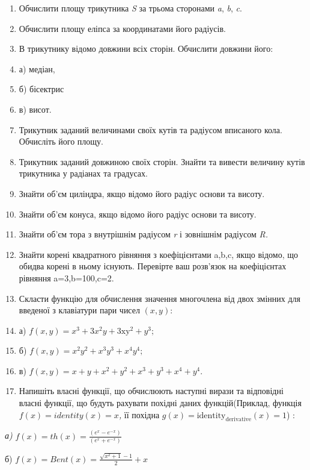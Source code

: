 \documentclass[]{article}
\begin{document}
\begin{enumerate}
\def\labelenumi{\arabic{enumi})}
\item
  Обчислити площу трикутника \emph{S} за трьома сторонами \emph{a},
  \emph{b}, \emph{c}.
\item
  Обчислити площу еліпса за координатами його радіусів.
\item
  В трикутнику відомо довжини всіх сторін. Обчислити довжини його:
\item
  а) медіан,
\item
  б) бісектрис
\item
  в) висот.
\item
  Трикутник заданий величинами своїх кутів та радіусом вписаного кола.
  Обчисліть його площу.
\item
  Трикутник заданий довжиною своїх сторін. Знайти та вивести величину
  кутів трикутника у радіанах та градусах.
\item
  Знайти об'єм циліндра, якщо відомо його радіус основи та висоту.
\item
  Знайти об'єм конуса, якщо відомо його радіус основи та висоту.
\item
  Знайти об'єм тора з внутрішнім радіусом \emph{r} і зовнішнім радіусом
  \emph{R.}
\item
  Знайти корені квадратного рівняння з коефіцієнтами a,b,c, якщо відомо,
  що обидва корені в ньому існують. Перевірте ваш розв'язок на
  коефіцієнтах рівняння a=3,b=100,c=2.
\item
  Скласти функцію для обчислення значення многочлена від двох змінних
  для введеної з клавіатури пари чисел \((x,y)\):
\item
  а) \(f(x,y) = x^{3} + 3x^{2}y + 3\mathrm{\text{xy}}^{2} + y^{3};\)
\item
  б) \(f(x,y) = x^{2}y^{2} + x^{3}y^{3} + x^{4}y^{4};\)
\item
  в)
  \(f(x,y) = x + y + x^{2} + y^{2} + x^{3} + y^{3} + x^{4} + y^{4}\mathrm{.}\)
\item
  Напишіть власні функції, що обчислюють наступні вирази та відповідні
  власні функції, що будуть рахувати похідні даних функцій(Приклад,
  функція \(f(x) = identity(x) = x\)\emph{,} її похідна
  \(g(x) = \text{identity}_{\text{derivative}}(x) = 1\)) :
\end{enumerate}

\emph{а)} \(f(x) = th(x) = \frac{(e^{x} - e^{- x})}{(e^{x} + e^{- x})}\)

б) \(f(x) = Bent(x) = \frac{\sqrt{x^{2} + 1} - 1}{2} + x\)
\end{document}
